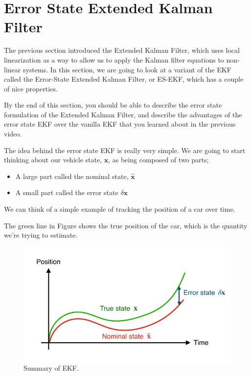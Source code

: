 \section{Error State Extended Kalman Filter}
\label{error_state_extended_kalman_filter}

The previous section introduced the Extended
Kalman Filter, which uses local linearization as a way to allow us to apply the Kalman
filter equations to non-linear systems. In this section, we are going to look
at a variant of the EKF called the Error-State Extended
Kalman Filter, or ES-EKF, which has a couple of nice properties. 

By the end of this section, you should be able to describe the error state
formulation of the Extended Kalman Filter, and describe the advantages of the error state EKF
over the vanilla EKF that you learned about in the
previous video. 

The idea behind
the error state EKF is really very simple. We are going to start thinking about our vehicle state, $\mathbf{x}$, as being composed
of two parts; 

\begin{itemize}
\item A large part called the nominal state, $\hat{\mathbf{x}}$
\item A small part called the error state $\delta \mathbf{x}$
\end{itemize}

We can think of a simple example of tracking the position of a car over time. 


The green line in Figure shows the true position
of the car, which is the quantity we're trying to estimate. 


\begin{figure}[!htb]
\begin{center}
\includegraphics[scale=0.280]{img/kalman_filter/es_extended_kalman_filter_1.jpeg}
\end{center}
\caption{Summary of EKF.}
\label{es_extended_kalman_filter_1}
\end{figure}

